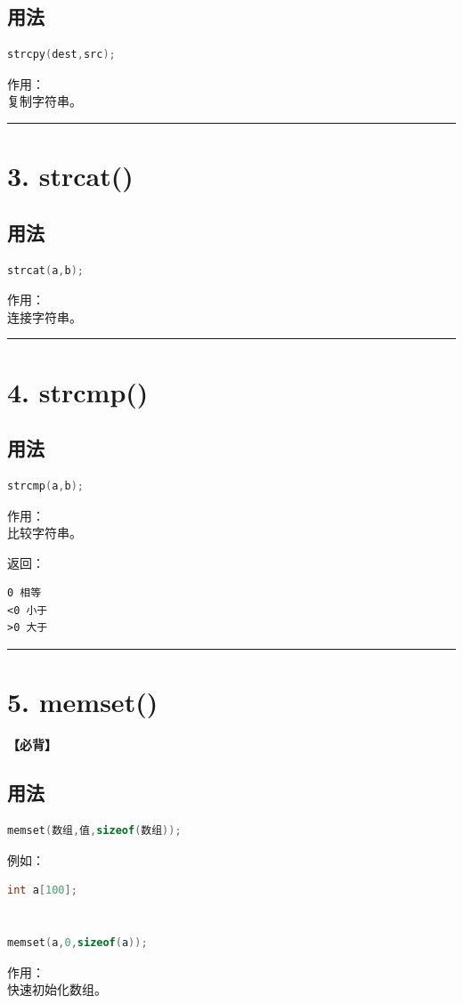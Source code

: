 \documentclass[10pt,twocolumn]{extarticle}
\begin{document}
\subsection{用法}
\begin{lstlisting}[language=C++]
strcpy(dest,src);
\end{lstlisting}
作用：\\
复制字符串。

\noindent\rule{\linewidth}{0.4pt}

\section{3. strcat()}

\subsection{用法}
\begin{lstlisting}[language=C++]
strcat(a,b);
\end{lstlisting}
作用：\\
连接字符串。

\noindent\rule{\linewidth}{0.4pt}

\section{4. strcmp()}

\subsection{用法}
\begin{lstlisting}[language=C++]
strcmp(a,b);
\end{lstlisting}
作用：\\
比较字符串。

返回：
\begin{lstlisting}
0 相等
<0 小于
>0 大于
\end{lstlisting}

\noindent\rule{\linewidth}{0.4pt}

\section{5. memset()}

\textbf{【必背】}

\subsection{用法}
\begin{lstlisting}[language=C++]
memset(数组,值,sizeof(数组));
\end{lstlisting}
例如：
\begin{lstlisting}[language=C++]
int a[100];


memset(a,0,sizeof(a));
\end{lstlisting}
作用：\\
快速初始化数组。
\end{document}
